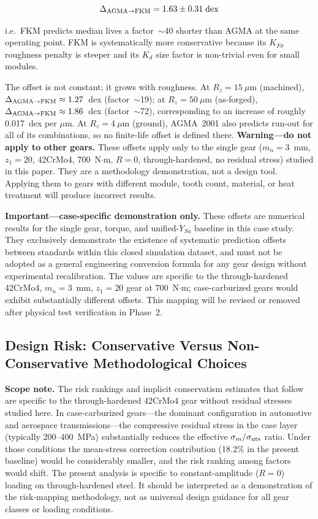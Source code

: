 \documentclass[twocolumn,12pt,a4paper]{article}
\begin{document}
\begin{equation}
\Delta_{\rm AGMA\to FKM} = 1.63 \pm 0.31\;\text{dex}
\label{eq:offsets}
\end{equation}

i.e.\ FKM predicts median lives a factor~$\sim$40 shorter than AGMA
at the same operating point. FKM is systematically more conservative
because its $K_{F\sigma}$ roughness penalty is steeper and its $K_d$
size factor is non-trivial even for small modules.

The offset is not constant; it grows with roughness. At
$R_z=15~\mu$m (machined), $\Delta_{\rm AGMA\to FKM} \approx
1.27$~dex (factor~$\sim$19); at $R_z=50~\mu$m (as-forged),
$\Delta_{\rm AGMA\to FKM} \approx 1.86$~dex (factor~$\sim$72),
corresponding to an increase of roughly 0.017~dex per $\mu$m. At
$R_z=4~\mu$m (ground), AGMA~2001 also predicts run-out for all of its
combinations, so no finite-life offset is defined there.
\textbf{Warning---do not apply to other gears.} These offsets apply
only to the single gear ($m_n=3$~mm, $z_1=20$, 42CrMo4,
700~N$\cdot$m, $R=0$, through-hardened, no residual stress) studied in
this paper. They are a methodology demonstration, not a design tool.
Applying them to gears with different module, tooth count, material,
or heat treatment will produce incorrect results.

\textbf{Important---case-specific demonstration only.}
These offsets are numerical results for the single gear, torque, and
unified-$Y_{Sa}$ baseline in this case study. They exclusively
demonstrate the existence of systematic prediction offsets between
standards within this closed simulation dataset, and must not be
adopted as a general engineering conversion formula for any gear
design without experimental recalibration. The values are specific to
the through-hardened 42CrMo4, $m_n=3$~mm, $z_1=20$ gear at
700~N$\cdot$m; case-carburized gears would exhibit substantially
different offsets. This mapping will be revised or removed after
physical test verification in Phase~2.

\subsection{Design Risk: Conservative Versus Non-Conservative Methodological Choices}

\textbf{Scope note.} The risk rankings and implicit conservatism
estimates that follow are specific to the through-hardened 42CrMo4
gear without residual stresses studied here. In case-carburized
gears---the dominant configuration in automotive and aerospace
transmissions---the compressive residual stress in the case layer
(typically 200--400~MPa) substantially reduces the effective
$\sigma_m/\sigma_{\rm uts}$ ratio. Under those conditions the
mean-stress correction contribution (18.2\% in the present baseline) would be
considerably smaller, and the risk ranking among factors would shift.
The present analysis is specific to constant-amplitude ($R=0$)
loading on through-hardened steel. It should be interpreted as a
demonstration of the risk-mapping methodology, not as universal
design guidance for all gear classes or loading conditions.
\end{document}
